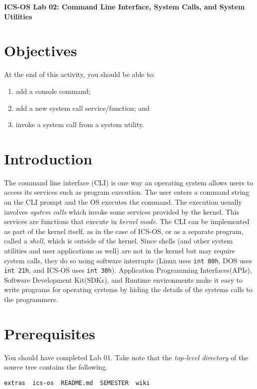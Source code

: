 \documentclass[a4paper, 11pt,oneside]{article}
\begin{document}
\begin{center}
   {\LARGE \textbf{ICS-OS Lab 02: Command Line Interface, System Calls, and System
Utilities }}
\end{center}

\section*{Objectives}
   At the end of this activity, you should be able to:
   \begin{enumerate}[itemsep=0pt,parsep=0pt]
       \item add a console command;
       \item add a new system call service/function; and
       \item invoke a system call from a system utility.
   \end{enumerate}   

\section{Introduction}
The command line interface (CLI) is one way an operating system allows users to
access its services such as program execution.  The user enters a command
string on the CLI prompt and the OS executes the command. The execution usually
involves \textit{system calls} which invoke some services provided by the kernel. 
This services are functions that execute in \textit{kernel mode}. 
The CLI can be implemented as part of the kernel itself,
as in the case of ICS-OS, or as a separate program, called a \textit{shell},
which is outside of the kernel.  Since shells (and other system utilities and user applications
 as well) are
not in the kernel but may require system calls, they do so using software
interrupts (Linux uses \texttt{int 80h}, DOS uses \texttt{int 21h}, and ICS-OS
uses \texttt{int 30h}). Application Programming Interfaces(APIs), Software
Development Kit(SDKs), and Runtime environments make it easy to write programs for
operating systems by hiding the details of the systems calls to the
programmers.


\section{Prerequisites}
You should have completed Lab 01.  Take note that the \textit{top-level directory} of the source 
tree contains the following. 
\begin{Verbatim}[frame=single]
extras  ics-os  README.md  SEMESTER  wiki 
\end{Verbatim}
\end{document}
